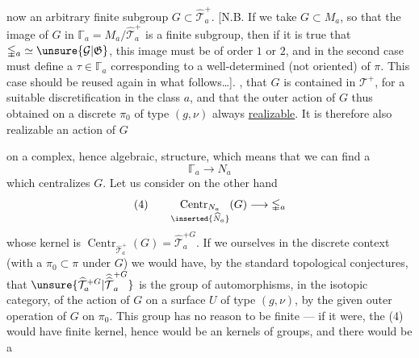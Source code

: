  now an arbitrary finite subgroup $G\subset\widehat{\mathcal T}_a^+$. [N.B. If we take  $G\subset M_a$, so that the image of $G$ in $\mathbb{\Gamma}_a=M_a/\widehat{\mathcal T}_a^+$ is a finite subgroup, then if it  is true that $\mathbb{\Gamma}_a\simeq\unsure{\mathcal G|\mathfrak G}$,  this image must be of order $1$ or $2$, and in the second case must  define a $\tau\in\mathbb{\Gamma}_a$ corresponding to a well-determined \uline{} (not oriented) of $\pi$. This case should be reused again in what follows\ldots].   , that $G$ is contained in $\mathcal T^+$,  for a suitable discretification in the class $a$, and that the outer action of $G$ thus obtained on a discrete $\pi_0$ of type $(g,\nu)$  always \uline{realizable}. It is therefore also realizable  an action of $G$


on a complex, hence algebraic, structure, which means that we can find a  
\[
\mathbb{\Gamma}_a\longrightarrow N_a
\]
which centralizes $G$. Let us consider on the other hand
\[
(4)\qquad
\underset{\inserted{\widehat N_a}}{\operatorname{Centr}_{N_a}}(G)
\longrightarrow\mathbb{\Gamma}_a
\]
whose kernel is $\operatorname{Centr}_{\widehat{\mathcal T}_a^+}(G)=\widehat{\mathcal T}_a^{+G}$.
If we  ourselves in the discrete context  (with a  $\pi_0\subset\pi$  under $G$) we would have, by the standard topological conjectures, that $\unsure{\widehat{\mathcal T}_a^{+G}|\widehat{\widehat{\mathcal T}}_a^{+G}}$ is the group of automorphisms, in the isotopic category, of the action of $G$ on a surface $U$ of type $(g,\nu)$,  by the given outer operation of $G$ on $\pi_0$. This group has no reason to be finite --- if it were, the  (4) would have finite kernel, hence would be an   kernels of groups, and there would be a

